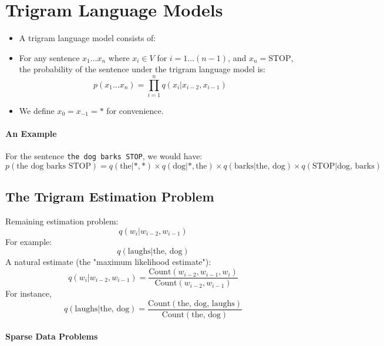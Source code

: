 \documentclass{book}
\begin{document}
\section{Trigram Language Models}
    \begin{itemize}
        \item A trigram language model consists of:
        \item For any sentence $x_1 \ldots x_n$ where $x_i \in V$ for $i = 1 \ldots (n-1)$, and $x_n = \text{STOP}$, the probability of the sentence under the trigram language model is:
        \[
            p(x_1 \ldots x_n) = \prod_{i=1}^{n} q(x_i|x_{i-2}, x_{i-1})
        \]
        \item We define $x_0 = x_{-1} = *$ for convenience.
    \end{itemize}


\paragraph{An Example}
  
    For the sentence \texttt{the dog barks STOP}, we would have:
    \[
        p(\text{the dog barks STOP}) = q(\text{the}|*, *) \times q(\text{dog}|*, \text{the}) \times q(\text{barks}|\text{the, dog}) \times q(\text{STOP}|\text{dog, barks})
    \]


\subsection{The Trigram Estimation Problem}
 
    Remaining estimation problem:
    \[
        q(w_i | w_{i-2}, w_{i-1})
    \]
    For example:
    \[
        q(\text{laughs} | \text{the, dog})
    \]
    A natural estimate (the "maximum likelihood estimate"):
    \[
        q(w_i | w_{i-2}, w_{i-1}) = \frac{{\text{Count}(w_{i-2}, w_{i-1}, w_i)}}{{\text{Count}(w_{i-2}, w_{i-1})}}
    \]
    For instance,
    \[
        q(\text{laughs} | \text{the, dog}) = \frac{{\text{Count}(\text{the, dog, laughs})}}{{\text{Count}(\text{the, dog})}}
    \]


\paragraph{Sparse Data Problems}
   
\end{document}

